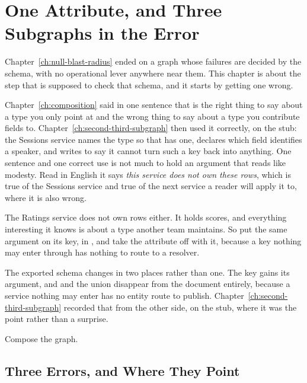\section{One Attribute, and Three Subgraphs in the Error}
\label{sec:ch15-one-attribute-and-three-errors}

%
Chapter~\ref{ch:null-blast-radius} ended on a graph whose failures are decided
by the schema, with no operational lever anywhere near them. This chapter is
about the step that is supposed to check that schema, and it starts by getting
one wrong.

%
Chapter~\ref{ch:composition} said in one sentence that 
is the right thing to say about a type you only point at and the wrong thing to
say about a type you contribute fields to.
Chapter~\ref{ch:second-third-subgraph} then used it correctly, on the
 stub: the Sessions service names the type so that
 has one, declares which field identifies a speaker, and
writes  to say it cannot turn such a key back into
anything. One sentence and one correct use is not much to hold an argument that
reads like modesty. Read in English it says \emph{this service does not own
these rows}, which is true of the Sessions service and true of the next service
a reader will apply it to, where it is also wrong.

%
The Ratings service does not own  rows either. It holds scores,
and everything interesting it knows is about a type another team maintains. So
put the same argument on its key, in , and take the
\code{[ReferenceResolver]} attribute off with it, because a key nothing may
enter through has nothing to route to a resolver.

%
The exported schema changes in two places rather than one. The key gains its
argument, and  and the  union disappear from the
document entirely, because a service nothing may enter has no entity route to
publish. Chapter~\ref{ch:second-third-subgraph} recorded that from the other
side, on the stub, where it was the point rather than a surprise.

Compose the graph.

\subsection{Three Errors, and Where They Point}

